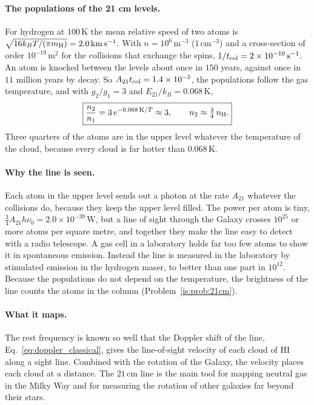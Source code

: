 \paragraph{The populations of the 21 cm levels.} For hydrogen at $100\,\mathrm K$ the mean relative speed of two atoms is $\sqrt{16k_BT/(\pi m_{\rm H})}=2.0\,\mathrm{km\,s^{-1}}$. With $n=10^6\,\mathrm{m^{-3}}$ ($1\,\mathrm{cm^{-3}}$) and a cross-section of order $10^{-19}\,\mathrm{m^2}$ for the collisions that exchange the spins, $1/t_{\rm col}=2\times10^{-10}\,\mathrm{s^{-1}}$. An atom is knocked between the levels about once in $150$ years, against once in $11$ million years by decay. So $A_{21}t_{\rm col}=1.4\times10^{-5}$, the populations follow the gas temperature, and with $g_2/g_1=3$ and $E_{21}/k_B=0.068\,\mathrm K$,
\begin{equation}
	\boxed{\frac{n_2}{n_1}=3\,e^{-0.068\,\mathrm K/T}\approx3,\qquad n_2\approx\tfrac34\,n_{\rm H}.}
	\label{is:eq:21cm_populations}
\end{equation}
Three quarters of the atoms are in the upper level whatever the temperature of the cloud, because every cloud is far hotter than $0.068\,\mathrm K$.

\paragraph{Why the line is seen.} Each atom in the upper level sends out a photon at the rate $A_{21}$ whatever the collisions do, because they keep the upper level filled. The power per atom is tiny, $\tfrac34A_{21}h\nu_0=2.0\times10^{-39}\,\mathrm W$, but a line of sight through the Galaxy crosses $10^{25}$ or more atoms per square metre, and together they make the line easy to detect with a radio telescope. A gas cell in a laboratory holds far too few atoms to show it in spontaneous emission. Instead the line is measured in the laboratory by stimulated emission in the hydrogen maser, to better than one part in $10^{12}$. Because the populations do not depend on the temperature, the brightness of the line counts the atoms in the column (Problem~\ref{is:prob:21cm}).

\paragraph{What it maps.} The rest frequency is known so well that the Doppler shift of the line, Eq.~\eqref{eq:doppler_classical}, gives the line-of-sight velocity of each cloud of HI along a sight line. Combined with the rotation of the Galaxy, the velocity places each cloud at a distance. The $21\,\mathrm{cm}$ line is the main tool for mapping neutral gas in the Milky Way and for measuring the rotation of other galaxies far beyond their stars.

